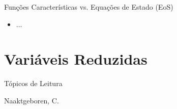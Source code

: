     \begin{frame}{Funções Características vs. Equações de Estado (EoS)}
        \begin{itemize}
            \item<1-> ...
        \end{itemize}
    \end{frame}

\section{Variáveis Reduzidas}

    \begin{frame}{Tópicos de Leitura}
        \begin{thebibliography}{Çengel, Y.~A., 2013}
                Naaktgeboren, C.
        \end{thebibliography}
    \end{frame}




